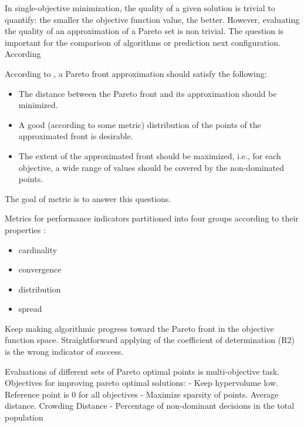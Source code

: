             In single-objective minimization, the quality of a given solution is trivial to quantify:
            the smaller the objective function value, the better. However, evaluating the quality of an approximation of a Pareto set is non trivial.
            The question is important for the comparison of algorithms or prediction next configuration. According

            According to \cite{ZitzlerDT00}, a Pareto front approximation should satisfy the following:
            \begin{itemize}
                \item The distance between the Pareto front and its approximation should be minimized.
                \item A good (according to some metric) distribution of the points of the approximated front is desirable.
                \item The extent of the approximated front should be maximized, i.e., for each objective, a wide range of values should be covered by the non-dominated points.
            \end{itemize}

            The goal of metric is to answer this questions.  

            Metrics for performance indicators partitioned into four groups according to their properties \cite{Audet2018PerformanceII}: 
            \begin{itemize}
                \item cardinality
                \item convergence
                \item distribution
                \item spread
            \end{itemize}
        
            Keep making algorithmic progress toward the Pareto front in the objective function space.
            Straightforward applying of the coefficient of determination (R2) is the wrong indicator of success. 
        
            Evaluations of different sets of Pareto optimal points is multi-objective task.
            Objectives for improving pareto optimal solutions:
            - Keep hypervolume low. Reference point is 0 for all objectives
            - Maximize sparsity of points. Average distance. Crowding Distance
            - Percentage of non-dominant decisions in the total population
        
